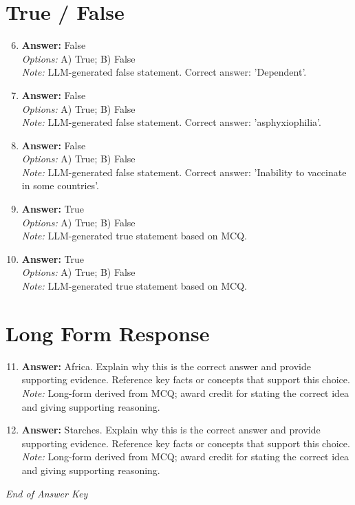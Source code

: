 \documentclass[12pt]{article}
\begin{document}
\section*{True / False}
\begin{enumerate}[label=\arabic*.]
\setcounter{enumi}{5}
\item \textbf{Answer:} False
\\ \textit{Options:} A) True; B) False
\\ \textit{Note:} LLM-generated false statement. Correct answer: 'Dependent'.
\item \textbf{Answer:} False
\\ \textit{Options:} A) True; B) False
\\ \textit{Note:} LLM-generated false statement. Correct answer: 'asphyxiophilia'.
\item \textbf{Answer:} False
\\ \textit{Options:} A) True; B) False
\\ \textit{Note:} LLM-generated false statement. Correct answer: 'Inability to vaccinate in some countries'.
\item \textbf{Answer:} True
\\ \textit{Options:} A) True; B) False
\\ \textit{Note:} LLM-generated true statement based on MCQ.
\item \textbf{Answer:} True
\\ \textit{Options:} A) True; B) False
\\ \textit{Note:} LLM-generated true statement based on MCQ.
\end{enumerate}

\section*{Long Form Response}
\begin{enumerate}[label=\arabic*.]
\setcounter{enumi}{10}
\item \textbf{Answer:} Africa. Explain why this is the correct answer and provide supporting evidence. Reference key facts or concepts that support this choice.
\\ \textit{Note:} Long-form derived from MCQ; award credit for stating the correct idea and giving supporting reasoning.
\item \textbf{Answer:} Starches. Explain why this is the correct answer and provide supporting evidence. Reference key facts or concepts that support this choice.
\\ \textit{Note:} Long-form derived from MCQ; award credit for stating the correct idea and giving supporting reasoning.
\end{enumerate}

\vfill
\noindent\textit{End of Answer Key}
\end{document}
